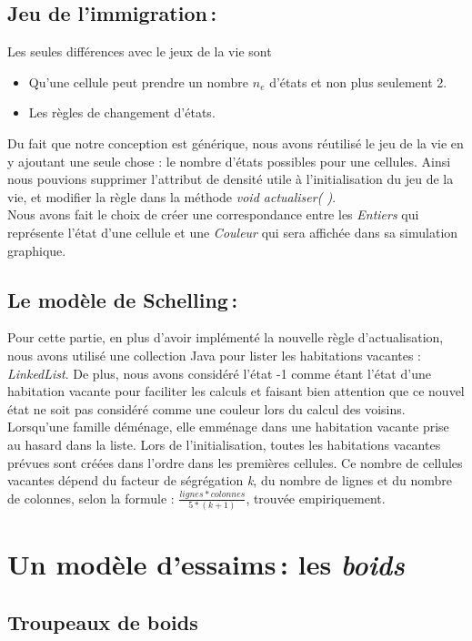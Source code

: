 \documentclass[a4paper, 10pt, french]{article}
\begin{document}
\subsection{Jeu de l'immigration\,:}
	{
Les seules différences avec le jeux de la vie sont 
	\begin{itemize}
		\item Qu'une cellule peut prendre un nombre {\em $n_e$} d'états et non plus seulement 2.
		\item Les règles de changement d'états.
	\end{itemize}
\indent Du fait que notre conception est générique, nous avons réutilisé le jeu de la vie en y ajoutant une seule chose : le nombre d'états possibles pour une cellules. Ainsi nous pouvions supprimer l'attribut de densité utile à l'initialisation du jeu de la vie, et modifier la règle dans la méthode {\em void actualiser( )}. 
\\ \indent Nous avons fait le choix de créer une correspondance entre les {\em Entiers} qui représente l'état d'une cellule et une {\em Couleur} qui sera affichée dans sa simulation graphique.
	}
\subsection{Le modèle de Schelling\,:}
 	{ 
        \indent Pour cette partie, en plus d'avoir implémenté la nouvelle règle d'actualisation, nous avons utilisé une collection Java pour lister les habitations vacantes : {\em LinkedList}.
        De plus, nous avons considéré l'état -1 comme étant l'état d'une habitation vacante pour faciliter les calculs et faisant bien attention que ce nouvel état ne soit pas considéré comme une couleur lors du calcul des voisins.
        Lorsqu'une famille déménage, elle emménage dans une habitation vacante prise au hasard dans la liste.
        Lors de l'initialisation, toutes les habitations vacantes prévues sont créées dans l'ordre dans les premières cellules. Ce nombre de cellules vacantes dépend du facteur de ségrégation {\em k}, du nombre de lignes et du nombre de colonnes, selon la formule : $ \frac{lignes*colonnes}{5*(k+1)} $, trouvée empiriquement.
	} 

\section{Un modèle d'essaims\,: les {\em boids}}
  \subsection{Troupeaux de boids}
  {
  
  }
\end{document}
